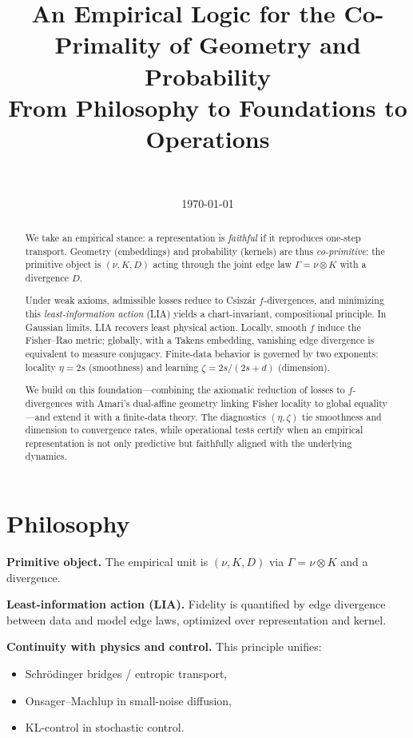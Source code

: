 \documentclass[11pt]{article}
\title{An Empirical Logic for the Co-Primality of Geometry and Probability\\[2pt]
\large From Philosophy to Foundations to Operations}
\author{~}
\date{\today}
\newcommand{\1}{\mathbf{1}}
\begin{document}
\maketitle

\begin{abstract}
We take an empirical stance: a representation is \emph{faithful} if it reproduces one-step transport. Geometry (embeddings) and probability (kernels) are thus \emph{co-primitive}: the primitive object is $(\nu,K,D)$ acting through the joint edge law $\Gamma=\nu\otimes K$ with a divergence $D$.

Under weak axioms, admissible losses reduce to Csiszár $f$-divergences, and minimizing this \emph{least-information action} (LIA) yields a chart-invariant, compositional principle. In Gaussian limits, LIA recovers least physical action. Locally, smooth $f$ induce the Fisher--Rao metric; globally, with a Takens embedding, vanishing edge divergence is equivalent to measure conjugacy. Finite-data behavior is governed by two exponents: locality $\eta=2s$ (smoothness) and learning $\zeta=2s/(2s+d)$ (dimension).

We build on this foundation—combining the axiomatic reduction of losses to $f$-divergences with Amari’s dual-affine geometry linking Fisher locality to global equality—and extend it with a finite-data theory. The diagnostics $(\eta,\zeta)$ tie smoothness and dimension to convergence rates, while operational tests certify when an empirical representation is not only predictive but faithfully aligned with the underlying dynamics.
\end{abstract}


\section{Philosophy}
\noindent\textbf{Primitive object.} The empirical unit is $(\nu,K,D)$ via $\Gamma=\nu\otimes K$ and a divergence.

\medskip
\noindent\textbf{Least-information action (LIA).} Fidelity is quantified by edge divergence between data and model edge laws, optimized over representation and kernel.

\medskip
\noindent\textbf{Continuity with physics and control.} This principle unifies:
\begin{itemize}
\item Schrödinger bridges / entropic transport,
\item Onsager–Machlup in small-noise diffusion,
\item KL-control in stochastic control.
\end{itemize}
\end{document}
